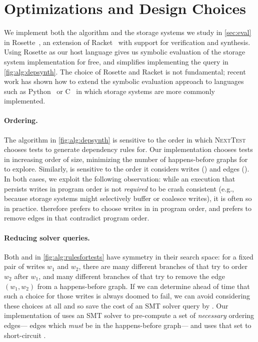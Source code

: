 \section{Optimizations and Design Choices}\label{s:impl}

We implement both the \depsynth algorithm
and the storage systems we study in \cref{sec:eval}
in Rosette~\cite{torlak:rosette},
an extension of Racket~\cite{felleisen:racket}
with support for verification and synthesis.
Using Rosette as our host language gives us symbolic evaluation of the storage system implementation for free,
and simplifies implementing the \crashconsistentalg query in \cref{fig:alg:depsynth}.
The choice of Rosette and Racket is not fundamental;
recent work has shown how to extend the symbolic evaluation approach to languages
such as Python~\cite{sigurbjarnarson:yggdrasil} or C~\cite{nelson:serval}
in which storage systems are more commonly implemented.

\paragraph{Ordering.}
The \depsynthalg algorithm in \cref{fig:alg:depsynth}
is sensitive to the order in which \textsc{NextTest} chooses tests to generate dependency rules for.
Our implementation chooses tests in increasing order of size,
minimizing the number of happens-before graphs for  to explore.
Similarly,  is sensitive to the order it considers writes (\phaseone)
and edges (\phasetwo).
In both cases, we exploit the following observation: 
while an execution that persists writes in program order is not \emph{required} to be crash consistent
(e.g., because storage systems might selectively buffer or coalesce writes),
it is often so in practice.
 therefore prefers to choose writes in \phaseone in program order,
and prefers to remove edges in \phasetwo that contradict program order.

\paragraph{Reducing solver queries.}
Both \phaseone and \phasetwo in \cref{fig:alg:rulesfortests}
have symmetry in their search space:
for a fixed pair of writes $w_1$ and $w_2$,
there are many different branches of \phaseone
that try to order $w_2$ after $w_1$,
and many different branches of \phasetwo
that try to remove the edge $(w_1, w_2)$ from a happens-before graph.
If we can determine ahead of time that such a choice for those writes is always doomed to fail,
we can avoid considering these choices at all
and so save the cost of an SMT solver query by \crashconsistentalg.
Our implementation of 
uses an SMT solver to
pre-compute a set of \emph{necessary} ordering edges---%
edges which \emph{must} be in the happens-before graph---%
and uses that set to short-circuit \crashconsistentalg.

